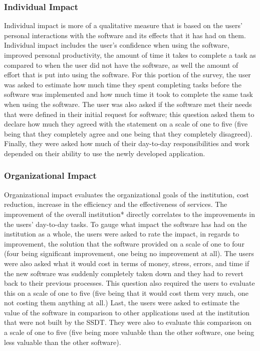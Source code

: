 \subsubsection{Individual Impact}
Individual impact is more of a qualitative measure that is based on the users' personal interactions with the software and its effects that it has had on them. Individual impact includes the user's confidence when using the software, improved personal productivity, the amount of time it takes to complete a task as compared to when the user did not have the software, as well the amount of effort that is put into using the software. For this portion of the survey, the user was asked to estimate how much time they spent completing tasks before the software was implemented and how much time it took to complete the same task when using the software. The user was also asked if the software met their needs that were defined in their initial request for software; this question asked them to declare how much they agreed with the statement on a scale of one to five (five being that they completely agree and one being that they  completely disagreed). Finally, they were asked how much of their day-to-day responsibilities and work depended on their ability to use the newly developed application.

\paragraph{}

\subsubsection{Organizational Impact}
Organizational impact evaluates the organizational goals of the institution, cost reduction, increase in the efficiency and the effectiveness of services. The improvement of the overall institution* directly correlates to the improvements in the users' day-to-day tasks. To gauge what impact the software has had on the institution as a whole, the users were asked to rate the impact, in regards to improvement, the solution that the software provided on a scale of one to four (four being significant improvement, one being no improvement at all). The users were also asked what it would cost in terms of money, stress, errors, and time if the new software was suddenly completely taken down and they had to revert back to their previous processes. This question also required the users to evaluate this on a scale of one to five (five being that it would cost them very much, one not costing them anything at all.) Last, the users were asked to estimate the value of the software in comparison to other applications used at the institution that were not built by the SSDT. They were also to evaluate this comparison on a scale of one to five (five being more valuable than the other software, one being less valuable than the other software).


